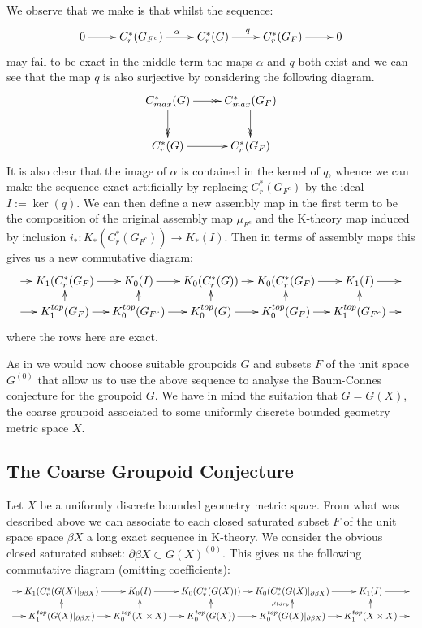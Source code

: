 We observe that we make is that whilst the sequence:
\begin{equation*}
\xymatrix{
0 \ar[r] & C_{r}^{*}(G_{F^{c}}) \ar[r]^{\alpha}& C_{r}^{*}(G) \ar[r]^{q} & C_{r}^{*}(G_{F}) \ar[r] & 0
}
\end{equation*}
may fail to be exact in the middle term the maps $\alpha$ and $q$ both exist and we can see that the map $q$ is also surjective by considering the following diagram.
\begin{equation*}
\xymatrix{C^{*}_{max}(G) \ar@{->>}[r] \ar@{->>}[d] & C^{*}_{max}(G_{F}) \ar@{->>}[d]\\
C^{*}_{r}(G)\ar@{->}[r] &   C^{*}_{r}(G_{F})
}
\end{equation*}
It is also clear that the image of $\alpha$ is contained in the kernel of $q$, whence we can make the sequence exact artificially by replacing $C_{r}^{*}(G_{F^{c}})$ by the ideal $I:=\ker(q)$. We can then define a new assembly map in the first term to be the composition of the original assembly map $\mu_{F^{c}}$ and the K-theory map induced by inclusion $i_{*}:K_{*}(C^{*}_{r}(G_{F^{c}})) \rightarrow K_{*}(I)$. Then in terms of assembly maps this gives us a new commutative diagram:
\begin{equation*}\label{Fig:F1}
\xymatrix@=1em{
\ar[r] & K_{1}(C^{*}_{r}(G_{F}) \ar[r] & K_{0}(I) \ar[r]& K_{0}(C^{*}_{r}(G)) \ar[r]& K_{0}(C^{*}_{r}(G_{F})\ar[r] & K_{1}(I) \ar[r] & \\
\ar[r] & K_{1}^{top}(G_{F}) \ar[r] \ar[u]& K_{0}^{top}(G_{F^{c}}) \ar[r]\ar[u]& K_{0}^{top}(G) \ar[r]\ar[u]& K_{0}^{top}(G_{F}) \ar[r]\ar[u]& K_{1}^{top}(G_{F^{c}})\ar[u] \ar[r]& 
}
\end{equation*}
where the rows here are exact. 

As in \cite{MR1911663} we would now choose suitable groupoids $G$ and subsets $F$ of the unit space $G^{(0)}$ that allow us to use the above sequence to analyse the Baum-Connes conjecture for the groupoid $G$. We have in mind the suitation that $G=G(X)$, the coarse groupoid associated to some uniformly discrete bounded geometry metric space $X$.

\subsection{The Coarse Groupoid Conjecture}
Let $X$ be a uniformly discrete bounded geometry metric space. From what was described above we can associate to each closed saturated subset $F$ of the unit space space $\beta X$ a long exact sequence in K-theory. We consider the obvious closed saturated subset: $\partial \beta X \subset G(X)^{(0)}$. This gives us the following commutative diagram (omitting coefficients):
\begin{equation*}
\xymatrix@=1em{
\ar[r] & K_{1}(C^{*}_{r}(G(X)|_{\partial\beta X}) \ar[r] & K_{0}(I) \ar[r]& K_{0}(C^{*}_{r}(G(X))) \ar[r]& K_{0}(C^{*}_{r}(G(X)|_{\partial\beta X})\ar[r] & K_{1}(I)\ar[r] &  \\
\ar[r] & K_{1}^{top}(G(X)|_{\partial\beta X}) \ar[r] \ar[u]& K_{0}^{top}(X \times X) \ar[r]\ar[u]& K_{0}^{top}(G(X)) \ar[r]\ar[u]& K_{0}^{top}(G(X)|_{\partial\beta X}) \ar[r]\ar[u]^{\mu_{bdry}}& K_{1}^{top}(X \times X)\ar[u]\ar[r] &
}
\end{equation*}

